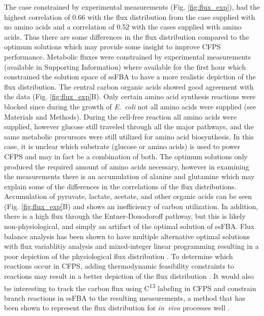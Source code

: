 \documentclass[journal=asbcd6,manuscript=article]{achemso}
\begin{document}
The case constrained by experimental measurements (Fig. \ref{fig:flux_exp}), had the highest correlation of 0.66 with the flux distribution from the case supplied with no amino acids and a correlation of 0.52 with the cases supplied with amino acids.
Thus there are some differences in the flux distribution compared to the optimum solutions which may provide some insight to improve CFPS performance. 
Metabolic fluxes were constrained by experimental measurements (available in Supporting Information) where available for the first hour which constrained the solution space of ssFBA to have a more realistic depiction of the flux distribution.
The central carbon organic acids showed good agreement with the data (Fig. \ref{fig:flux_exp}B).
Only certain amino acid synthesis reactions were blocked since during the growth of \emph{E.~coli} not all amino acids were supplied (see Materials and Methods).
During the cell-free reaction all amino acids were supplied, however glucose still traveled through all the major pathways, and the same metabolic precursors were still utilized for amino acid biosynthesis.
In this case, it is unclear which substrate (glucose or amino acids) is used to power CFPS and may in fact be a combination of both.
The optimum solutions only produced the required amount of amino acids necessary, however in examining the measurements there is an accumulation of alanine and glutamine which may explain some of the differences in the correlations of the flux distributions.
Accumulation of pyruvate, lactate, acetate, and other organic acids can be seen (Fig. \ref{fig:flux_exp}B) and shows an inefficiency of carbon utilization.
In addition, there is a high flux through the Entner-Douodoroff pathway, but this is likely non-physiological, and simply an artifact of the optimal solution of ssFBA.
Flux balance analysis has been shown to have multiple alternative optimal solutions with flux variablitiy analysis and mixed-integer linear programming resulting in a poor depiction of the physiological flux distribution \cite{LEE2000711, Mahadevan2003264, Schuetz119}.  
To determine which reactions occur in CFPS, adding thermodynamic feasibility constraints to reactions may result in a better depiction of the flux distribution \cite{Henry:2007,Hamilton:2013}.
It would also be interesting to track the carbon flux using C\textsuperscript{13} labeling in CFPS and constrain branch reactions in ssFBA to the resulting measurements, a method that has been shown to represent the flux distribution for \emph{in~vivo} processes well \cite{Zamboni:2009}.
\end{document}
